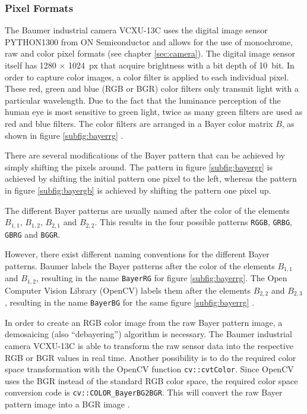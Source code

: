 \subsubsection{Pixel Formats}
\label{subsubsec:pixel_format}

The Baumer industrial camera VCXU-13C uses the digital image sensor PYTHON1300 from ON Semiconductor and allows for the use of monochrome, raw and color pixel formats (see chapter \ref{sec:camera}).
The digital image sensor itself has 1280 $\times$ \SI{1024}{px} that acquire brightness with a bit depth of \SI{10}{bit}.
In order to capture color images, a color filter is applied to each individual pixel.
These red, green and blue (RGB or BGR) color filters only transmit light with a particular wavelength.
Due to the fact that the luminance perception of the human eye is most sensitive to green light, twice as many green filters are used as red and blue filters.
The color filters are arranged in a Bayer color matrix $B$, as shown in figure \ref{subfig:bayerrg} \cite{dcs}.

There are several modifications of the Bayer pattern that can be achieved by simply shifting the pixels around.
The pattern in figure \ref{subfig:bayergr} is achieved by shifting the initial pattern one pixel to the left, whereas the pattern in figure \ref{subfig:bayergb} is achieved by shifting the pattern one pixel up.

The different Bayer patterns are usually named after the color of the elements $B_{1,1}$, $B_{1,2}$, $B_{2,1}$ and $B_{2,2}$.
This results in the four possible patterns \texttt{RGGB}, \texttt{GRBG}, \texttt{GBRG} and \texttt{BGGR}.

However, there exist different naming conventions for the different Bayer patterns.
Baumer labels the Bayer patterns after the color of the elements $B_{1,1}$ and $B_{1,2}$, resulting in the name \texttt{BayerRG} for figure \ref{subfig:bayerrg}.
The Open Computer Vision Library (OpenCV) labels them after the elements $B_{2,2}$ and $B_{2,3}$, resulting in the name \texttt{BayerBG} for the same figure \ref{subfig:bayerrg} \cite{baumer_opencv}.

In order to create an RGB color image from the raw Bayer pattern image, a demosaicing (also ``debayering'') algorithm is necessary.
The Baumer industrial camera VCXU-13C is able to transform the raw sensor data into the respective RGB or BGR values in real time.
Another possibility is to do the required color space transformation with the OpenCV function \texttt{cv::cvtColor}.
Since OpenCV uses the BGR instead of the standard RGB color space, the required color space conversion code is \texttt{cv::COLOR\_BayerBG2BGR}.
This will convert the raw Bayer pattern image into a BGR image \cite{opencv_csc}.

